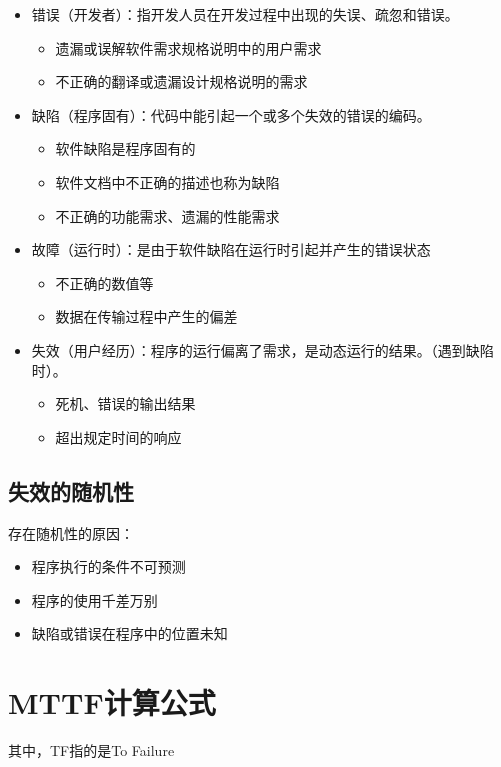 \begin{itemize}
  \item 错误（开发者）：指开发人员在开发过程中出现的失误、疏忽和错误。
  \begin{itemize}
    \item 遗漏或误解软件需求规格说明中的用户需求
    \item 不正确的翻译或遗漏设计规格说明的需求
  \end{itemize}
  \item 缺陷（程序固有）：代码中能引起一个或多个失效的错误的编码。
  \begin{itemize}
    \item 软件缺陷是程序固有的
    \item 软件文档中不正确的描述也称为缺陷
    \item 不正确的功能需求、遗漏的性能需求
  \end{itemize}
  \item 故障（运行时）：是由于软件缺陷在运行时引起并产生的错误状态
  \begin{itemize}
    \item 不正确的数值等
    \item 数据在传输过程中产生的偏差
  \end{itemize}
  \item 失效（用户经历）：程序的运行偏离了需求，是动态运行的结果。（遇到缺陷时）。
  \begin{itemize}
    \item 死机、错误的输出结果
    \item 超出规定时间的响应
  \end{itemize}
\end{itemize}

\subsection{失效的随机性}

存在随机性的原因：
\begin{itemize}
  \item 程序执行的条件不可预测
  \item 程序的使用千差万别
  \item 缺陷或错误在程序中的位置未知
\end{itemize}

\section{MTTF计算公式}

其中，TF指的是To Failure


